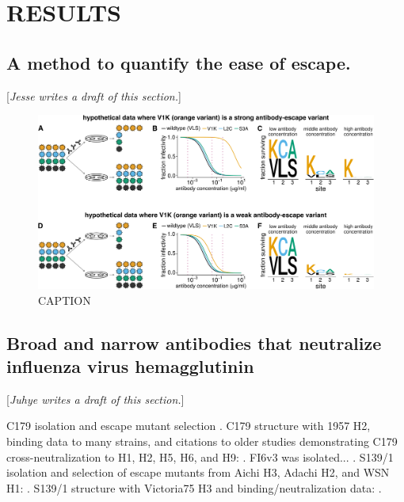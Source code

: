 \documentclass[11pt]{article}
\newcommand{\comment}[1]{{\color{red}[\textsl{#1}]}}
\begin{document}
\section*{RESULTS}

\subsection*{A method to quantify the ease of escape.}
\comment{Jesse writes a draft of this section.}
\begin{figure}
\centerline{\includegraphics[width=\textwidth]{figs/fracsurvive_example/fracsurvive_fig.pdf}}
\caption{\label{fig:fracsurvive_example}
CAPTION
}
\end{figure}

\subsection*{Broad and narrow antibodies that neutralize influenza virus hemagglutinin}
\comment{Juhye writes a draft of this section.}

C179 isolation and escape mutant selection \cite{okuno1993common}.
C179 structure with 1957 H2, binding data to many strains, and citations to older studies demonstrating C179 cross-neutralization to H1, H2, H5, H6, and H9:  \cite{dreyfus2013structure}.
FI6v3 was isolated... \cite{corti2011neutralizing}.
S139/1 isolation and selection of escape mutants from Aichi H3, Adachi H2, and WSN H1: \cite{yoshida2009cross}.
S139/1 structure with Victoria75 H3 and binding/neutralization data: \cite{lee2012heterosubtypic}.
\end{document}
